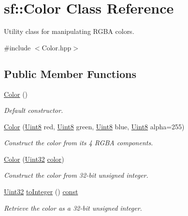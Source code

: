 \hypertarget{classsf_1_1_color}{\section{sf\-:\-:Color Class Reference}
\label{classsf_1_1_color}
}


Utility class for manipulating R\-G\-B\-A colors.  




{\ttfamily \#include $<$Color.\-hpp$>$}

\subsection*{Public Member Functions}
\begin{DoxyCompactItemize}
\item 
\hyperlink{classsf_1_1_color_ac2eb4393fb11ad3fa3ccf34e92fe08e4}{Color} ()
\begin{DoxyCompactList}\small\item\em Default constructor. \end{DoxyCompactList}\item 
\hyperlink{classsf_1_1_color_ac791dc61be4c60baac50fe700f1c9850}{Color} (\hyperlink{namespacesf_a4ef3d630785c4f296f9b4f274c33d78e}{Uint8} red, \hyperlink{namespacesf_a4ef3d630785c4f296f9b4f274c33d78e}{Uint8} green, \hyperlink{namespacesf_a4ef3d630785c4f296f9b4f274c33d78e}{Uint8} blue, \hyperlink{namespacesf_a4ef3d630785c4f296f9b4f274c33d78e}{Uint8} alpha=255)
\begin{DoxyCompactList}\small\item\em Construct the color from its 4 R\-G\-B\-A components. \end{DoxyCompactList}\item 
\hyperlink{classsf_1_1_color_a5449f4b2b9a78230d40ce2c223c9ab2e}{Color} (\hyperlink{namespacesf_aa746fb1ddef4410bddf198ebb27e727c}{Uint32} \hyperlink{_entity_8cpp_a864889304a90873adb9c6e289a54bcf4}{color})
\begin{DoxyCompactList}\small\item\em Construct the color from 32-\/bit unsigned integer. \end{DoxyCompactList}\item 
\hyperlink{namespacesf_aa746fb1ddef4410bddf198ebb27e727c}{Uint32} \hyperlink{classsf_1_1_color_a48f75a30fc93e79390e6d700e4b4b558}{to\-Integer} () \hyperlink{term__entry_8h_a57bd63ce7f9a353488880e3de6692d5a}{const} 
\begin{DoxyCompactList}\small\item\em Retrieve the color as a 32-\/bit unsigned integer. \end{DoxyCompactList}\item 

\end{DoxyCompactItemize}
